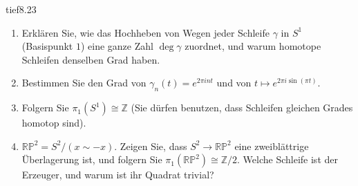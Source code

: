 \begin{karte}{tief}{8.23}{\typtypisch}{}
\begin{enumerate}[label=(\alph*),leftmargin=1.6em,itemsep=2pt]
\item Erklären Sie, wie das Hochheben von Wegen jeder Schleife $\gamma$ in $S^{1}$ (Basispunkt $1$) eine ganze Zahl $\deg\gamma$ zuordnet, und warum homotope Schleifen denselben Grad haben.
\item Bestimmen Sie den Grad von $\gamma_n(t) = e^{2\pi int}$ und von $t\mapsto e^{2\pi i\sin(\pi t)}$.
\item Folgern Sie $\pi_1(S^{1})\cong\mathbb Z$ (Sie dürfen benutzen, dass Schleifen gleichen Grades homotop sind).
\item $\mathbb{RP}^{2} = S^{2}/(x\sim-x)$. Zeigen Sie, dass $S^{2}\to\mathbb{RP}^{2}$ eine zweiblättrige Überlagerung ist, und folgern Sie $\pi_1(\mathbb{RP}^{2})\cong\mathbb Z/2$. Welche Schleife ist der Erzeuger, und warum ist ihr Quadrat trivial?
\end{enumerate}
\end{karte}

